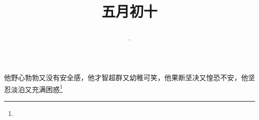 \title{\date[d=15,m=6,y=2024][year:cn-y,年,month:cn,day:cn,日,·,weekday]·五月初十 }
他野心勃勃又没有安全感，他才智超群又幼稚可笑，他果断坚决又惶恐不安，他坚忍淡泊又充满困惑\footnote{ }

